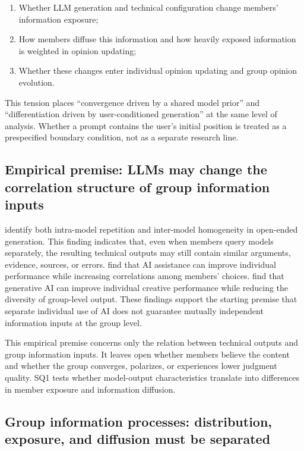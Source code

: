\documentclass[11pt,a4paper]{article}
\begin{document}
\begin{enumerate}
\item Whether LLM generation and technical configuration change members' information exposure;
\item How members diffuse this information and how heavily exposed information is weighted in opinion updating;
\item Whether these changes enter individual opinion updating and group opinion evolution.
\end{enumerate}

This tension places ``convergence driven by a shared model prior'' and ``differentiation driven by user-conditioned generation'' at the same level of analysis. Whether a prompt contains the user's initial position is treated as a prespecified boundary condition, not as a separate research line.

\subsection{Empirical premise: LLMs may change the correlation structure of group information inputs}

\citet{jiang2025} identify both intra-model repetition and inter-model homogeneity in open-ended generation. This finding indicates that, even when members query models separately, the resulting technical outputs may still contain similar arguments, evidence, sources, or errors. \citet{fugener2021} find that AI assistance can improve individual performance while increasing correlations among members' choices. \citet{doshi2024} find that generative AI can improve individual creative performance while reducing the diversity of group-level output. These findings support the starting premise that separate individual use of AI does not guarantee mutually independent information inputs at the group level.

This empirical premise concerns only the relation between technical outputs and group information inputs. It leaves open whether members believe the content and whether the group converges, polarizes, or experiences lower judgment quality. SQ1 tests whether model-output characteristics translate into differences in member exposure and information diffusion.

\subsection{Group information processes: distribution, exposure, and diffusion must be separated}
\end{document}
